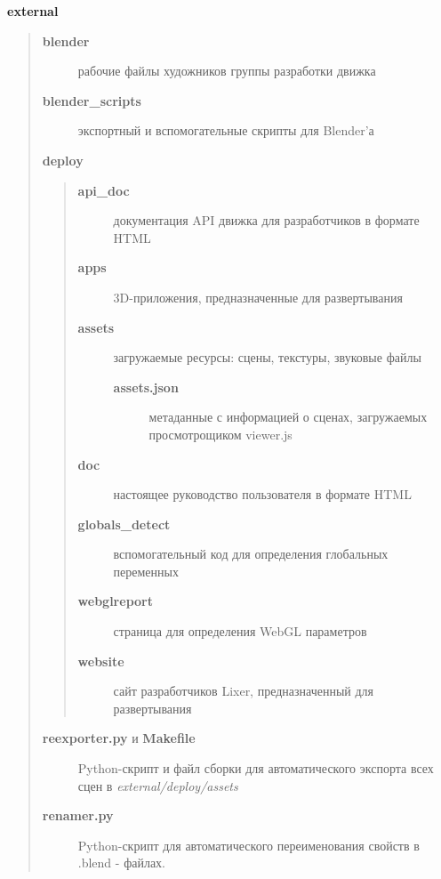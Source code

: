 \documentclass[a4paper,12pt,oneside]{sphinxmanual}
\begin{document}
\textbf{external}
\begin{quote}
\begin{description}
\item[{\textbf{blender}}] \leavevmode
рабочие файлы художников группы разработки движка

\item[{\textbf{blender\_scripts}}] \leavevmode
экспортный и вспомогательные скрипты для Blender'а

\end{description}

\textbf{deploy}
\begin{quote}
\begin{description}
\item[{\textbf{api\_doc}}] \leavevmode
документация API движка для разработчиков в формате HTML

\item[{\textbf{apps}}] \leavevmode
3D-приложения, предназначенные для развертывания

\item[{\textbf{assets}}] \leavevmode
загружаемые ресурсы: сцены, текстуры, звуковые файлы
\begin{description}
\item[{\textbf{assets.json}}] \leavevmode
метаданные с информацией о сценах, загружаемых просмотрощиком
viewer.js

\end{description}

\item[{\textbf{doc}}] \leavevmode
настоящее руководство пользователя в формате HTML

\item[{\textbf{globals\_detect}}] \leavevmode
вспомогательный код для определения глобальных переменных

\item[{\textbf{webglreport}}] \leavevmode
страница для определения WebGL параметров

\item[{\textbf{website}}] \leavevmode
сайт разработчиков Lixer, предназначенный для развертывания

\end{description}
\end{quote}
\begin{description}
\item[{\textbf{reexporter.py} и \textbf{Makefile}}] \leavevmode
Python-скрипт и файл сборки для автоматического экспорта всех сцен в \emph{external/deploy/assets}

\item[{\textbf{renamer.py}}] \leavevmode
Python-скрипт для автоматического переименования свойств в .blend -
файлах.

\end{description}
\end{quote}
\end{document}

